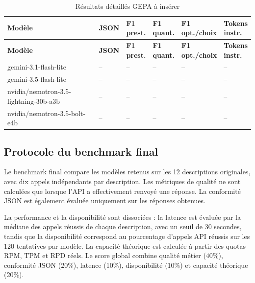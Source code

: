 {\scriptsize
\setlength{\tabcolsep}{3pt}
\begin{longtable}{p{}p{}p{}p{}p{}p{}}
\caption{Résultats détaillés GEPA à insérer}\\
\toprule
\textbf{Modèle} & \textbf{JSON} & \shortstack{\textbf{F1}\\\textbf{prest.}} & \shortstack{\textbf{F1}\\\textbf{quant.}} & \shortstack{\textbf{F1}\\\textbf{opt./choix}} & \shortstack{\textbf{Tokens}\\\textbf{instr.}} \\
\midrule
\endfirsthead
\toprule
\textbf{Modèle} & \textbf{JSON} & \shortstack{\textbf{F1}\\\textbf{prest.}} & \shortstack{\textbf{F1}\\\textbf{quant.}} & \shortstack{\textbf{F1}\\\textbf{opt./choix}} & \shortstack{\textbf{Tokens}\\\textbf{instr.}} \\
\midrule
\endhead
gemini-3.1-flash-lite & -- & -- & -- & -- & -- \\
gemini-3.5-flash-lite & -- & -- & -- & -- & -- \\
nvidia/nemotron-3.5-lightning-30b-a3b & -- & -- & -- & -- & -- \\
nvidia/nemotron-3.5-bolt-e4b & -- & -- & -- & -- & -- \\
\bottomrule
\end{longtable}
}

\subsection{Protocole du benchmark final}
Le benchmark final compare les modèles retenus sur les 12 descriptions originales, avec dix appels indépendants par description. Les métriques de qualité ne sont calculées que lorsque l'API a effectivement renvoyé une réponse. La conformité JSON est également évaluée uniquement sur les réponses obtenues.

La performance et la disponibilité sont dissociées : la latence est évaluée par la médiane des appels réussis de chaque description, avec un seuil de 30 secondes, tandis que la disponibilité correspond au pourcentage d'appels API réussis sur les 120 tentatives par modèle. La capacité théorique est calculée à partir des quotas RPM, TPM et RPD réels. Le score global combine qualité métier (40\%), conformité JSON (20\%), latence (10\%), disponibilité (10\%) et capacité théorique (20\%).


